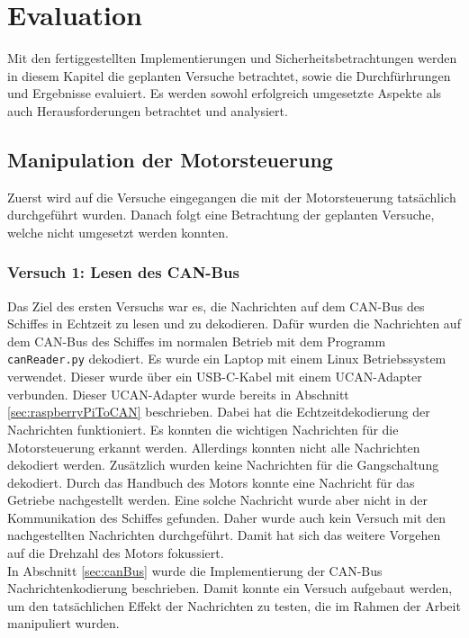 \chapter{Evaluation}

Mit den fertiggestellten Implementierungen und Sicherheitsbetrachtungen werden in diesem Kapitel die geplanten
Versuche betrachtet, sowie die Durchfürhrungen und Ergebnisse evaluiert. Es werden sowohl erfolgreich umgesetzte Aspekte als auch
Herausforderungen betrachtet und analysiert.

\section{Manipulation der Motorsteuerung} \label{sec:evManipulationMotor}
Zuerst wird auf die Versuche eingegangen die mit der Motorsteuerung tatsächlich durchgeführt wurden. Danach folgt 
eine Betrachtung der geplanten Versuche, welche nicht umgesetzt werden konnten.

\subsection{Versuch 1: Lesen des CAN-Bus}
Das Ziel des ersten Versuchs war es, die Nachrichten auf dem CAN-Bus des Schiffes in Echtzeit zu lesen und zu dekodieren.
Dafür wurden die Nachrichten auf dem CAN-Bus des Schiffes im normalen Betrieb mit dem Programm \texttt{canReader.py} 
dekodiert. Es wurde ein Laptop mit einem Linux Betriebssystem verwendet. Dieser wurde über ein USB-C-Kabel mit einem 
UCAN-Adapter verbunden. Dieser UCAN-Adapter wurde bereits in Abschnitt \ref{sec:raspberryPiToCAN} beschrieben. 
Dabei hat die Echtzeitdekodierung der Nachrichten funktioniert. Es konnten die wichtigen Nachrichten für die Motorsteuerung
erkannt werden. Allerdings konnten nicht alle Nachrichten dekodiert werden. Zusätzlich wurden keine Nachrichten für die Gangschaltung
dekodiert. Durch das Handbuch
des Motors konnte eine Nachricht für das Getriebe nachgestellt werden. Eine solche Nachricht wurde aber nicht in der Kommunikation des 
Schiffes gefunden. Daher wurde auch kein Versuch mit den nachgestellten Nachrichten durchgeführt. Damit hat sich 
das weitere Vorgehen auf die Drehzahl des Motors fokussiert. \\
In Abschnitt \ref{sec:canBus} wurde die Implementierung der CAN-Bus Nachrichtenkodierung beschrieben. 
Damit konnte ein Versuch
aufgebaut werden, um den tatsächlichen Effekt der Nachrichten zu testen, die im Rahmen der Arbeit manipuliert wurden. 

